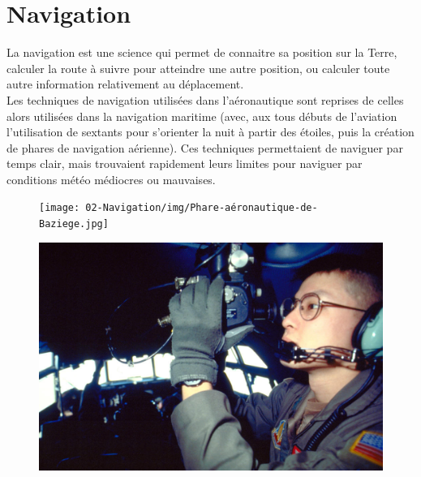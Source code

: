 \section{Navigation}
	La navigation est une science qui permet de connaitre sa position sur la Terre, calculer la route à suivre pour atteindre une autre position, ou calculer toute autre information relativement au déplacement. \\

	Les techniques de navigation utilisées dans l'aéronautique sont reprises de celles alors utilisées dans la navigation maritime (avec, aux tous débuts de l'aviation l'utilisation de sextants pour s'orienter la nuit à partir des étoiles, puis la création de phares de navigation aérienne). Ces techniques permettaient de naviguer par temps clair, mais trouvaient rapidement leurs limites pour naviguer par conditions météo médiocres ou mauvaises.
	
	\begin{center}
	\begin{minipage}[c]{1.0\linewidth}
	\begin{figure}[H]
	\begin{minipage}[c]{0.4\linewidth}
	\centering
	\texttt{[image: 02-Navigation/img/Phare-aéronautique-de-Baziege.jpg]}
	\end{minipage}
	\begin{minipage}[c]{0.6\linewidth}
	\centering
	\includegraphics[width=0.95\linewidth]{02-Navigation/img/Sextant-C130.jpg}
	\end{minipage}
	\end{figure}
	\end{minipage}
	\end{center}
	
